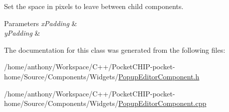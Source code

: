 Set the space in pixels to leave between child components.


\begin{DoxyParams}{Parameters}
{\em x\+Padding} & \\
\hline
{\em y\+Padding} & \\
\hline
\end{DoxyParams}


The documentation for this class was generated from the following files\+:\begin{DoxyCompactItemize}
\item 
/home/anthony/\+Workspace/\+C++/\+Pocket\+C\+H\+I\+P-\/pocket-\/home/\+Source/\+Components/\+Widgets/\mbox{\hyperlink{PopupEditorComponent_8h}{Popup\+Editor\+Component.\+h}}\item 
/home/anthony/\+Workspace/\+C++/\+Pocket\+C\+H\+I\+P-\/pocket-\/home/\+Source/\+Components/\+Widgets/\mbox{\hyperlink{PopupEditorComponent_8cpp}{Popup\+Editor\+Component.\+cpp}}\end{DoxyCompactItemize}
